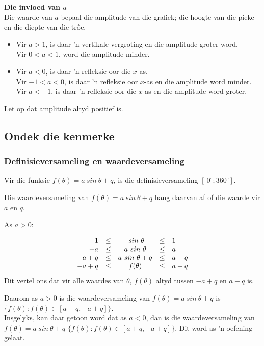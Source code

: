 \textbf{Die invloed van $a$}
\\
Die waarde van  $a$ bepaal die amplitude van die grafiek; die hoogte van die pieke en die diepte van die trôe.
\begin{itemize}
 \item Vir $a>1$, is daar 'n vertikale vergroting en die amplitude groter word.\\
Vir $0<a<1$, word die amplitude minder.
\item Vir $a<0$, is daar 'n refleksie oor die $x$-as.\\ 
Vir $-1<a<0$, is daar 'n refleksie oor $x$-as en die amplitude word minder.\\
Vir $a<-1$, is daar 'n refleksie oor die $x$-as en die amplitude word groter.
\end{itemize}

Let op dat amplitude altyd positief is.\\

\subsection*{Ondek die kenmerke}
\subsubsection*{Definisieversameling en waardeversameling}
\nopagebreak
Vir die funksie $f(\theta )=a~sin~\theta +q$, is die definisieversameling $[~0^{\circ}; 360^{\circ}]$.\par 
Die waardeversameling van $f(\theta )=a~sin~\theta +q$ hang daarvan af of die waarde vir $a$ en $q$.\par 
As $a>0$:\par 
\nopagebreak\noindent{}
\begin{equation*}
  \begin{array}{rcccl}
    \hfill   -1 & \leq &  ~sin~\theta     & \leq & 1   \hfill \\
    \hfill   -a & \leq & a~sin~\theta     & \leq & a   \hfill \\
    \hfill -a+q & \leq & a~sin~\theta + q & \leq & a+q \hfill \\
    \hfill -a+q & \leq &  f(\theta)      & \leq & a+q \hfill 
  \end{array}
\end{equation*}
Dit vertel ons dat vir alle waardes van $\theta $, $f(\theta )$ altyd tussen $-a+q$ en $a+q$ is.\par
Daarom as $a>0$ is die waardeversameling van  $f(\theta )=a~sin~\theta +q$ is $\{f(\theta ):f(\theta )\in [a+q,-a+q]\}$.\\
Insgelyks, kan daar getoon word dat as $a<0$, dan is die waardeversameling van $f(\theta )=a~sin~\theta +q$ $\{f(\theta ):f(\theta )\in [a+q,-a+q]\}$. Dit word as ’n oefening gelaat.\par 

